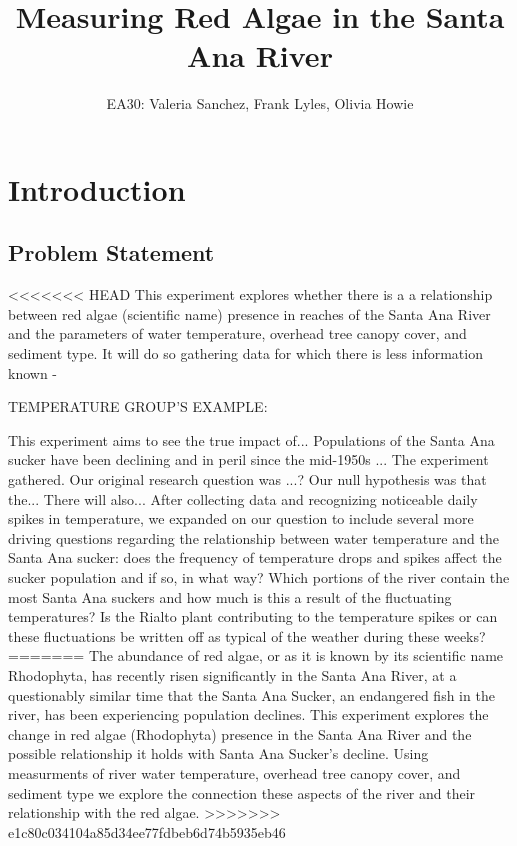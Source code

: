 \documentclass{article}
\title{Measuring Red Algae in the Santa Ana River}
\author{EA30: Valeria Sanchez, Frank Lyles, Olivia Howie}
\begin{document}



\maketitle

\newpage
\tableofcontents
\newpage

\section{Introduction}


\subsection{Problem Statement}
<<<<<<< HEAD
This experiment explores whether there is a a relationship between red algae (scientific name) presence in reaches of the Santa Ana River
and the parameters of water temperature, overhead tree canopy cover, and sediment type. It will do so gathering data for which there is less information known - 

TEMPERATURE GROUP'S EXAMPLE: 

This experiment aims to see the true impact of...  
Populations of the Santa Ana sucker have
been declining and in peril since the mid-1950s ... 
The experiment gathered. 
Our original research question was ...? 
Our null hypothesis was that the... There will also... 
After collecting data and recognizing noticeable
daily spikes in temperature, we expanded on our question to include several
more driving questions regarding the relationship between water temperature
and the Santa Ana sucker: does the frequency of temperature drops and spikes
affect the sucker population and if so, in what way? Which portions of the
river contain the most Santa Ana suckers and how much is this a result of the
fluctuating temperatures? Is the Rialto plant contributing to the temperature
spikes or can these fluctuations be written off as typical of the weather during
these weeks?
=======
The abundance of red algae, or as it is known by its scientific name Rhodophyta, has recently risen significantly in the Santa Ana River, at a questionably similar time that the Santa Ana Sucker, an endangered fish in the river, has been experiencing population declines. This experiment explores the change in red algae (Rhodophyta) presence in the Santa Ana River and the possible relationship it holds with Santa Ana Sucker's decline. Using measurments of river water temperature, overhead tree canopy cover, and sediment type we explore the connection these aspects of the river and their relationship with the red algae.
>>>>>>> e1c80c034104a85d34ee77fdbeb6d74b5935eb46
\end{document}
